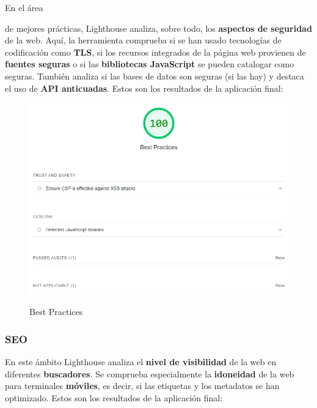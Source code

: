 \documentclass[12pt,twoside,titlepage]{report}
\begin{document}
En el área {de mejores prácticas, Lighthouse analiza, sobre todo, los \textbf{aspectos de seguridad} de la web. Aquí, la herramienta comprueba si se han usado tecnologías de codificación como \textbf{TLS}, si los recursos integrados de la página web provienen de \textbf{fuentes seguras} o si las \textbf{bibliotecas JavaScript} se pueden catalogar como seguras. También analiza si las bases de datos son seguras (si las hay) y destaca el uso de \textbf{API anticuadas}. Estos son los resultados de la aplicación final:

\begin{figure}[H]
    \centering
    \includegraphics[scale=0.6]{Lighthouse/BestPractices}
    \label{fig:Lighthouse_bestpractices}
    \caption{Best Practices}
\end{figure}

\subsubsection{SEO}

En este ámbito Lighthouse analiza el \textbf{nivel de visibilidad} de la web en diferentes \textbf{buscadores}. Se comprueba especialmente la \textbf{idoneidad} de la web para terminales \textbf{móviles}, es decir, si las etiquetas y los metadatos se han optimizado. Estos son los resultados de la aplicación final:

}
\end{document}
